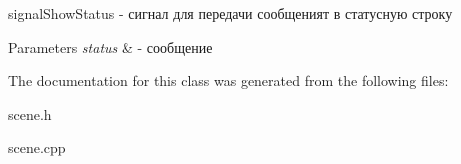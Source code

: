 signal\+Show\+Status -\/ сигнал для передачи сообщеният в статусную строку 


\begin{DoxyParams}{Parameters}
{\em status} & -\/ сообщение \\
\hline
\end{DoxyParams}


The documentation for this class was generated from the following files\+:\begin{DoxyCompactItemize}
\item 
scene.\+h\item 
scene.\+cpp\end{DoxyCompactItemize}

